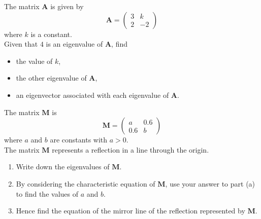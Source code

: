 \documentclass[leqno]{article}
\begin{document}
\djsFrontMatter
\begin{enumerate}[
  label=\textbf{\arabic*.},
  leftmargin=*,
  topsep=0pt,
  partopsep=0pt,
  parsep=0pt
]

\questionitem

The matrix $\mathbf{A}$ is given by
\[\mathbf{A} = \begin{pmatrix} 3 & k \\ 2 & -2 \end{pmatrix}\]
where $k$ is a constant. \\

Given that $4$ is an eigenvalue of $\mathbf{A}$, find
\begin{itemize}
  \item the value of $k$,
  \item the other eigenvalue of $\mathbf{A}$,
  \item an eigenvector associated with each eigenvalue of $\mathbf{A}$.
\end{itemize}

\newpage

\questionitem

The matrix $\mathbf{M}$ is
\[\mathbf{M} = \begin{pmatrix} a & 0.6 \\ 0.6 & b \end{pmatrix}\]
where $a$ and $b$ are constants with $a > 0$. \\

The matrix $\mathbf{M}$ represents a reflection in a line through the origin. \\
\begin{enumerate}[label=\textbf{(\alph*)}]
  \item Write down the eigenvalues of $\mathbf{M}$.  \\
  \item By considering the characteristic equation of $\mathbf{M}$, use your answer to part (a) to find the values of $a$ and $b$.  \\
  \item Hence find the equation of the mirror line of the reflection represented by $\mathbf{M}$.  \\
\end{enumerate}

\newpage


\end{enumerate}
\end{document}
